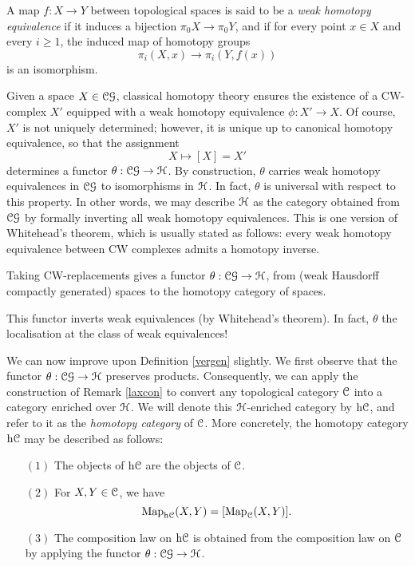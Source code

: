 \begin{1.1.3 Equivalences of Top Cats}
\begin{definition}
A map $f: X \rightarrow Y$ between topological spaces is said to be a {\it weak homotopy equivalence}
if it induces a bijection $\pi_0 X \rightarrow \pi_0 Y$, and if 
for every point $x \in X$ and every $i \geq 1$, the induced map of homotopy groups
$$ \pi_{i}(X,x) \rightarrow \pi_i(Y,f(x))$$ is an isomorphism.
\end{definition}

Given a space $X \in \operatorname{\mathcal{C}\mathcal{G}}$, classical homotopy theory ensures the existence of a CW-complex
$X'$ equipped with a weak homotopy equivalence $\phi: X' \rightarrow X$. Of course,
$X'$ is not uniquely determined; however, it is unique up to canonical homotopy equivalence,
so that the assignment
$$ X \mapsto [X] = X'$$
determines a functor $\theta: \operatorname{\mathcal{C}\mathcal{G}} \rightarrow \operatorname{\mathcal{H}}$. By construction, $\theta$ carries
weak homotopy equivalences in $\operatorname{\mathcal{C}\mathcal{G}}$ to isomorphisms in $\operatorname{\mathcal{H}}$. In fact, $\theta$
is universal with respect to this property. In other words, we may describe $\operatorname{\mathcal{H}}$
as the category obtained from $\operatorname{\mathcal{C}\mathcal{G}}$ by formally inverting all weak homotopy equivalences.
This is one version of Whitehead's theorem, which is usually stated as follows: every weak homotopy equivalence between CW complexes admits a homotopy inverse.
\begin{shaded}
Taking CW-replacements gives a functor $\theta: \operatorname{\mathcal{C}\mathcal{G}} \rightarrow \operatorname{\mathcal{H}}$, from (weak Hausdorff compactly generated) spaces to the homotopy category of spaces.

This functor inverts weak equivalences (by Whitehead's theorem). In fact, $\theta$ the localisation at the class of weak equivalences!
\end{shaded}


We can now improve upon Definition \ref{vergen} slightly. We first observe that
the functor $\theta: \operatorname{\mathcal{C}\mathcal{G}} \rightarrow \operatorname{\mathcal{H}}$ preserves products. Consequently, we can apply the construction of Remark \ref{laxcon} to convert any topological category $\operatorname{\mathcal{C}}$ into a category enriched over $\operatorname{\mathcal{H}}$. We will denote this $\operatorname{\mathcal{H}}$-enriched category by $\rm{h} \it{\operatorname{\mathcal{C}}}$, and refer to it as the {\it homotopy category} of $\operatorname{\mathcal{C}}$. More concretely, the homotopy category
$\rm{h} \it{\operatorname{\mathcal{C}}}$ may be described as follows:
\begin{itemize}
\item[$(1)$] The objects of $\rm{h} \it{\operatorname{\mathcal{C}}}$ are the objects of $\operatorname{\mathcal{C}}$.
\item[$(2)$] For $X,Y \in \operatorname{\mathcal{C}}$, we have
$$ \operatorname{{Map}}_{ \rm{h} \it{\operatorname{\mathcal{C}}} }(X,Y) = [ \operatorname{{Map}}_{\operatorname{\mathcal{C}}}(X,Y) ].$$
\item[$(3)$] The composition law on $\rm{h} \it{\operatorname{\mathcal{C}}}$ is obtained from the composition law on
$\operatorname{\mathcal{C}}$ by applying the functor $\theta: \operatorname{\mathcal{C}\mathcal{G}} \rightarrow \operatorname{\mathcal{H}}$.
\end{itemize}


\end{1.1.3 Equivalences of Top Cats}
